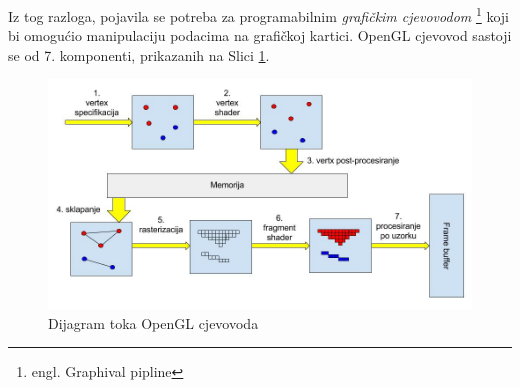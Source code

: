 Iz tog razloga, pojavila se potreba za programabilnim \emph{grafičkim cjevovodom} \footnote{engl. Graphival pipline} koji bi omogućio manipulaciju podacima na grafičkoj kartici. OpenGL cjevovod sastoji se od 7. komponenti\cite{opengl-wiki-pipeline}, prikazanih na Slici \ref{fig:pipeline}.

\begin{figure}[H]
\caption{Dijagram toka OpenGL cjevovoda}
\label{fig:pipeline}
\begin{center}
\includegraphics[scale=0.3]{pipeline.jpg}
\end{center}
\end{figure}

